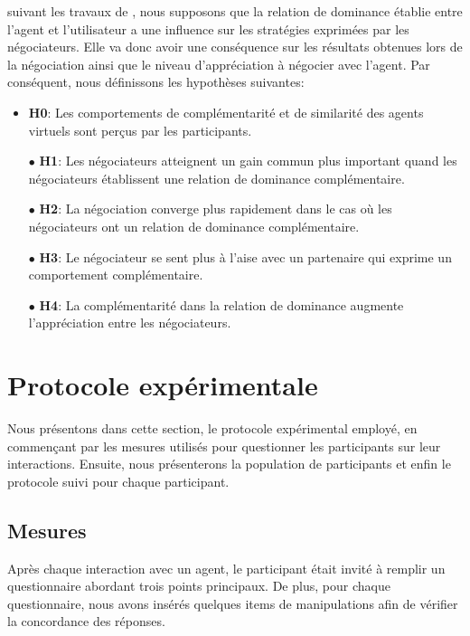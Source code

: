 	suivant les travaux de \cite{tiedens2003power,..}, nous supposons que la relation de dominance établie entre l'agent et l'utilisateur a une influence sur les stratégies exprimées par les négociateurs. Elle va donc avoir une conséquence sur les résultats obtenues lors de la négociation ainsi que le niveau d'appréciation à négocier avec l'agent.
	 Par conséquent, nous définissons les hypothèses suivantes: 
		\begin{itemize}
			\item\textbf{H0}: Les comportements de complémentarité et de similarité des agents virtuels sont perçus par les participants.
			\item [$\bullet$] \textbf{H1}: Les négociateurs atteignent un gain commun plus important quand les négociateurs établissent une relation de dominance complémentaire.
			\item [$\bullet$] \textbf{H2}: La négociation converge plus rapidement dans le cas où les négociateurs ont un relation de dominance complémentaire. 
			\item [$\bullet$] \textbf{H3}: Le négociateur se sent plus à l'aise avec un partenaire qui exprime un comportement complémentaire.
			\item [$\bullet$] \textbf{H4}: La complémentarité dans la relation de dominance augmente l'appréciation entre les négociateurs.
		\end{itemize}



\section{Protocole expérimentale}
\label{sec:procedure}
	Nous présentons dans cette section, le protocole expérimental employé, en commençant par les mesures utilisés pour questionner les participants sur leur interactions. Ensuite, nous présenterons la population de participants et enfin le protocole suivi pour chaque participant. 
	
	\subsection{Mesures}
		Après chaque interaction avec un agent, le participant était invité à remplir un questionnaire abordant trois points principaux. De plus, pour chaque questionnaire, nous avons insérés quelques items de manipulations afin de vérifier la concordance des réponses. 
		
